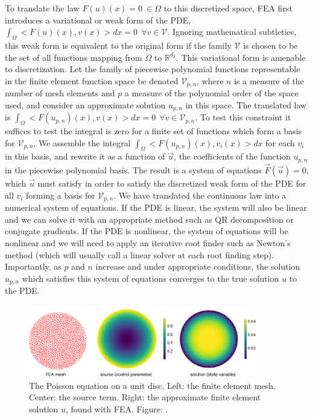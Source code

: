 \documentclass{puthesis}
\begin{document}
To translate the law $F(u)(x) = 0 \ \in \Omega$ to this discretized space,
FEA first introduces a variational or weak form of the PDE,
$\int_\Omega <F(u)(x), v(x)> dx = 0 \ \ \forall v \in \mathcal{V}$.
Ignoring mathematical subtleties, this weak form is equivalent to the original form
if the family $\mathcal{V}$ is chosen to be the set of all functions mapping from
$\Omega$ to $\mathbb{R}^{d_2}$.
This variational form is amenable to discretization.
Let the family of piecewise polynomial functions representable in the finite element
function space be denoted $\mathcal{V}_{p, n}$, where $n$ is a measure of the number of
mesh elements and $p$ a measure of the polynomial order of the space used, and
consider an approximate solution $u_{p, n}$ in this space.
The translated law is $\int_\Omega <F(u_{p, n})(x), v(x)> dx = 0 \ \
\forall v \in \mathcal{V}_{p, n}$.
To test this constraint it suffices to test the integral is zero for a finite
set of functions which form a basis for $\mathcal{V}_{p, n}$.
We assemble the integral $\int_\Omega <F(u_{p, n})(x), v_i(x)> dx$ for each $v_i$ in
this basis, and rewrite it as a function of $\vec{u}$, the coefficients of the
function $u_{p, n}$ in the piecewise polynomial basis.
The result is a system of equations $\vec{F}(\vec{u}) = 0$,
which $\vec{u}$ must satisfy in order to satisfy
the discretized weak form of the PDE for all $v_i$ forming a basis for
$\mathcal{V}_{p, n}$.
We have translated the continuous law into a numerical system
of equations.
If the PDE is linear, the system will also be linear and we can solve it with an
appropriate method such as QR decomposition or conjugate gradients.
If the PDE is nonlinear, the system of equations will be nonlinear and we will need
to apply an iterative root finder such as Newton's method (which will usually
call a linear solver at each root finding step).
Importantly, as $p$ and $n$ increase and under appropriate conditions, the
solution $u_{p, n}$ which satisfies this system of equations converges to the true
solution $u$ to the PDE.

\begin{figure}[t]
  \centering
\includegraphics[width=10cm]{intro_figures/poisson_equation.pdf}
\caption{\small The Poisson equation on a unit disc. Left: the finite element mesh.
Center: the source term. Right: the approximate finite element solution $u$, found with
FEA. Figure: \citet{xue2020amortized}.}%
\label{Fig:poisson}%
\end{figure}
\end{document}
